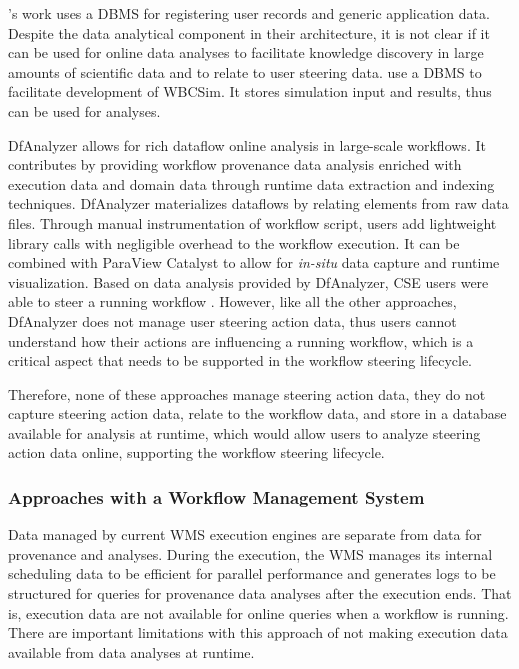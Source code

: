 \citet{Danani2015Computational}'s work uses a DBMS for registering user records and
generic application data.
Despite the data analytical component in their architecture, it is not
clear if it can be used for online data analyses to facilitate knowledge
discovery in large amounts of scientific data and to relate to user
steering data. \citet{Shu2011Computational,Shu2006WBCSim:} use a DBMS to facilitate development of WBCSim.
It stores simulation input and results, thus can be used for analyses.

DfAnalyzer \cite{Silva2017Raw,Camata2018In,silva_dfanalyzer:_2018} allows for rich dataflow online analysis in large-scale workflows. It contributes by providing workflow provenance data analysis enriched with execution data and domain data through runtime data extraction and indexing techniques.
DfAnalyzer materializes dataflows by relating elements from raw data files. Through manual instrumentation of workflow script, users add lightweight library calls with negligible overhead to the workflow execution. It can be combined with ParaView Catalyst to allow for \textit{in-situ} data capture and runtime visualization. Based on data analysis provided by DfAnalyzer, CSE users were able  to steer a running workflow \cite{Camata2018In}.
However, like all the other approaches, DfAnalyzer does not manage user steering action data, thus users cannot understand how their actions are influencing a running workflow, which is a critical aspect that needs to be supported in the workflow steering lifecycle.

Therefore, none of these approaches manage steering action data, \ie{} they do not capture steering action data, relate to the workflow data, and store in a database available for analysis at runtime, which would allow users to analyze steering action data online, supporting the workflow steering lifecycle.


\subsubsection{Approaches with a Workflow Management System}

Data managed by current WMS execution engines are separate
from data for provenance and analyses. During the execution, the WMS
manages its internal scheduling data to be efficient for parallel
performance and generates logs to be structured for queries for
provenance data analyses after the execution ends. That is, execution
data are not available for online queries when a workflow is running.
There are important limitations with this approach of not making
execution data available from data analyses at runtime.

